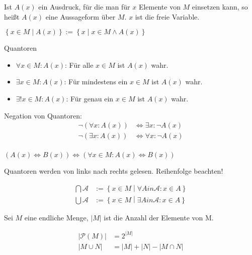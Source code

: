 \begin{definition}
  Ist $A(x)$ ein Ausdruck, für die man für $x$ Elemente von $M$ einsetzen kann, so heißt $A(x)$ eine Aussageform über $M$. $x$ ist die freie Variable.
\end{definition}
\begin{remark}
  $\left\{ x \in M \middle| A(x) \right\} := \left\{ x \middle| x \in M \wedge A(x) \right\}$
\end{remark}
\begin{definition}
  Quantoren
  \begin{itemize}
  \item $\forall x \in M: A(x)$: Für alle $x \in M$ ist $A(x)$ wahr.\index[sym]{$\forall$}
  \item $\exists x \in M: A(x)$: Für mindestens ein $x \in M$ ist $A(x)$ wahr.\index[sym]{$\exists$}
  \item $\exists! x \in M: A(x)$: Für genau ein $x \in M$ ist $A(x)$ wahr.
  \end{itemize}
\end{definition}
\begin{remark}
  Negation von Quantoren:
  \begin{align*}
    \neg (\forall x: A(x)) &\iff \exists x: \neg A(x) \\
    \neg (\exists x: A(x)) &\iff \forall x: \neg A(x) \\
  \end{align*}
\end{remark}
\begin{definition}
  $(A(x) \iff B(x)) \iff (\forall x \in M: A(x) \iff B(x))$
\end{definition}
\begin{remark}
  Quantoren werden von links nach rechts gelesen. Reihenfolge beachten!
\end{remark}
\begin{definition}
  \begin{align*}
    \bigcap \mathscr{A} &:= \left\{ x \in M \middle| \forall A in \mathscr{A}: x \in A \right\} \\
    \bigcup \mathscr{A} &:= \left\{ x \in M \middle| \exists A in \mathscr{A}: x \in A \right\}
  \end{align*}
\end{definition}
\begin{definition}
  Sei $M$ eine endliche Menge, $|M|$ ist die Anzahl der Elemente von M.
\end{definition}
\begin{remark}
  \begin{align*}
    |\mathscr{P}(M)| &= 2^{|M|} \\
    |M \cup N| &= |M| + |N| - |M \cap N| \\
  \end{align*}
\end{remark}

